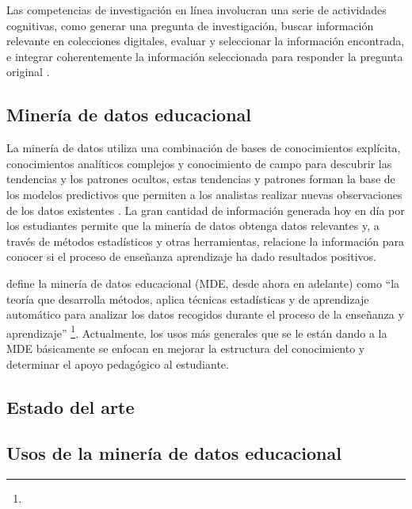 Las competencias de investigación en línea involucran una serie de actividades cognitivas, como generar una pregunta de investigación, buscar información relevante en colecciones digitales, evaluar y seleccionar la información encontrada, e integrar coherentemente la información seleccionada para responder la pregunta original \parencite{eisenberg1990information}.

\subsection*{Minería de datos educacional}
La minería de datos utiliza una combinación de bases de conocimientos explícita, conocimientos analíticos complejos y conocimiento de campo para descubrir las tendencias y los patrones ocultos, estas tendencias y patrones forman la base de los modelos predictivos que permiten a los analistas realizar nuevas observaciones de los datos existentes \parencite{luan2002data}. La gran cantidad de información generada hoy en día por los estudiantes permite que la minería de datos obtenga datos relevantes y, a través de métodos estadísticos y otras herramientas, relacione la información para conocer si el proceso de enseñanza aprendizaje ha dado resultados positivos. 

\textcite[p.~9]{mining2012enhancing} define la minería de datos educacional (MDE, desde ahora en adelante) como “la teoría que desarrolla métodos, aplica técnicas estadísticas y de aprendizaje automático para analizar los datos recogidos durante el proceso de la enseñanza y aprendizaje” \footnote{\traduccionlibre}. Actualmente, los usos más generales que se le están dando a la MDE básicamente se enfocan en mejorar la estructura del conocimiento y determinar el apoyo pedagógico al estudiante.

\subsection{Estado del arte}

\subsection*{Usos de la minería de datos educacional}



